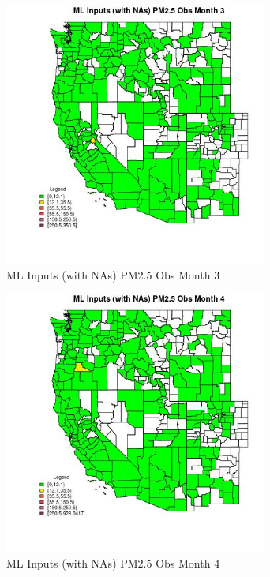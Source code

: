 \begin{figure} 
\centering  
\includegraphics[width=0.77\textwidth]{Code_Outputs/Report_ML_input_PM25_Step4_part_f_de_duplicated_aves_prioritize_24hr_obswNAs_CountyPM25_ObsmedianMonth3.jpg} 
\caption{\label{fig:Report_ML_input_PM25_Step4_part_f_de_duplicated_aves_prioritize_24hr_obswNAsCountyPM25_ObsmedianMonth3}ML Inputs (with NAs) PM2.5 Obs Month 3} 
\end{figure} 
 

\begin{figure} 
\centering  
\includegraphics[width=0.77\textwidth]{Code_Outputs/Report_ML_input_PM25_Step4_part_f_de_duplicated_aves_prioritize_24hr_obswNAs_CountyPM25_ObsmedianMonth4.jpg} 
\caption{\label{fig:Report_ML_input_PM25_Step4_part_f_de_duplicated_aves_prioritize_24hr_obswNAsCountyPM25_ObsmedianMonth4}ML Inputs (with NAs) PM2.5 Obs Month 4} 
\end{figure} 
 

